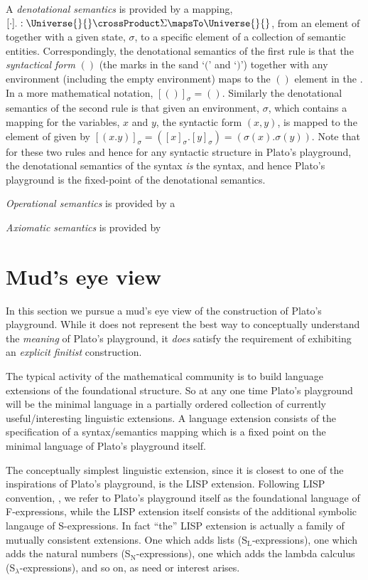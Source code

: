 A \emph{denotational semantics} is provided by a mapping, $[ \cdot ]_{\cdot} :
\Universe{}{} \crossProduct \Sigma \mapsTo \Universe{}{}$, from an element of
\Universe{}{} together with a given state, $\sigma$, to a specific element of a
collection of semantic entities. Correspondingly, the denotational semantics of
the first rule is that the \emph{syntactical form} $()$ (the marks in the sand
`$($' and `$)$') together with any environment (including the empty environment)
maps to the $()$ element in the \Universe{}{}. In a more mathematical notation,
$[()]_{\sigma} = ()$. Similarly the denotational semantics of the second rule is
that given an environment, $\sigma$, which contains a mapping for the variables,
$x$ and $y$, the syntactic form $(x , y)$, is mapped to the element of
\Universe{}{} given by $[ ( x . y ) ]_{\sigma} = ( [x]_{\sigma} . [y]_{\sigma} )
= ( \sigma(x) . \sigma(y) )$. Note that for these two rules and hence for any
syntactic structure in Plato's playground, the denotational semantics of the
syntax \emph{is} the syntax, and hence Plato's playground is the fixed-point of
the denotational semantics.

\emph{Operational semantics} is provided by a 

\emph{Axiomatic semantics} is provided by

\section{Mud's eye view}

In this section we pursue a mud's eye view of the construction of Plato's
playground. While it does not represent the best way to conceptually understand
the \emph{meaning} of Plato's playground, it \emph{does} satisfy the requirement
of exhibiting an \emph{explicit finitist} construction.

The typical activity of the mathematical community is to build language
extensions of the foundational structure. So at any one time Plato's playground
will be the minimal language in a partially ordered collection of currently
useful/interesting linguistic extensions. A language extension consists of the
specification of a syntax/semantics mapping which is a fixed point on the
minimal language of Plato's playground itself.

The conceptually simplest linguistic extension, since it is closest to one of
the inspirations of Plato's playground, is the LISP extension. Following LISP
convention, \cite{mcCarthy1960lisp}, we refer to Plato's playground itself as
the foundational language of F-expressions, while the LISP extension itself
consists of the additional symbolic langauge of S-expressions. In fact ``the''
LISP extension is actually a family of mutually consistent extensions. One which
adds lists (S$_{\text{L}}$-expressions), one which adds the natural numbers
(S$_{\text{N}}$-expressions), one which adds the lambda calculus
(S$_{\lambda}$-expressions), and so on, as need or interest arises.

